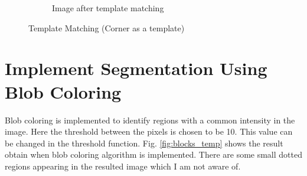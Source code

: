\documentclass[12pt]{article}
\begin{document}
\begin{figure}
\begin{subfigure}[b]{0.475\textwidth}
		\caption[]%
		{{\small Image after template matching}}    
		\label{fig:chess_result}
	\end{subfigure}
	\caption[ ]
	{\small Template Matching (Corner as a template)} 
	\label{fig:chess_temp}
\end{figure}

\section{Implement Segmentation Using Blob Coloring}
Blob coloring is implemented to identify regions with a common intensity in the
image. Here the threshold between the pixels is chosen to be 10. This value can be changed in the threshold function. Fig. \ref{fig:blocks_temp} shows the result obtain when blob coloring algorithm is implemented. There are some small dotted regions appearing in the resulted image which I am not aware of. 
\end{document}
